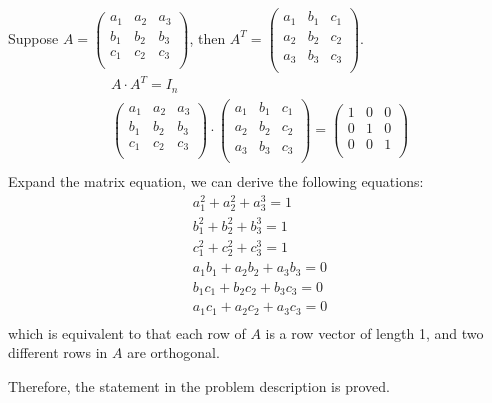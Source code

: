 \documentclass{article}
\begin{document}
Suppose $A = \begin{pmatrix}
               a_1 & a_2 & a_3 \\
               b_1 & b_2 & b_3 \\
               c_1 & c_2 & c_3 \\ 
             \end{pmatrix}$, then
$A^T = \begin{pmatrix}
         a_1 & b_1 & c_1 \\
         a_2 & b_2 & c_2 \\
         a_3 & b_3 & c_3 \\ 
       \end{pmatrix}$.
\begin{gather*}
  A \cdot A^T = I_n \\
  \begin{pmatrix}
    a_1 & a_2 & a_3 \\
    b_1 & b_2 & b_3 \\
    c_1 & c_2 & c_3 \\
  \end{pmatrix} \cdot
  \begin{pmatrix}
    a_1 & b_1 & c_1 \\
    a_2 & b_2 & c_2 \\
    a_3 & b_3 & c_3 \\
  \end{pmatrix} = 
  \begin{pmatrix}
    1 & 0 & 0 \\
    0 & 1 & 0 \\
    0 & 0 & 1 \\
  \end{pmatrix} \\
\end{gather*}
Expand the matrix equation, we can derive the following equations:
\begin{gather*}
  a_1^2 + a_2^2 + a_3^3 = 1 \\
  b_1^2 + b_2^2 + b_3^3 = 1 \\
  c_1^2 + c_2^2 + c_3^3 = 1 \\
  a_1b_1 + a_2b_2 + a_3b_3 = 0 \\
  b_1c_1 + b_2c_2 + b_3c_3 = 0 \\
  a_1c_1 + a_2c_2 + a_3c_3 = 0 \\
\end{gather*}
which is equivalent to that each row of $A$ is a row vector of length 1, and two 
different rows in $A$ are orthogonal.

Therefore, the statement in the problem description is proved.
\end{document}

